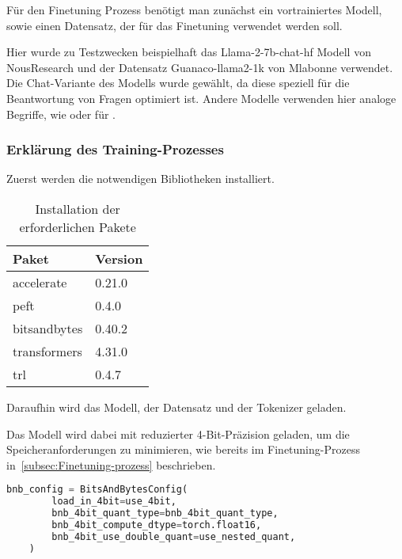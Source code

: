 \documentclass[german,report]{i1thesis}
\begin{document}
Für den Finetuning Prozess benötigt man zunächst ein vortrainiertes Modell, sowie einen Datensatz, der für das Finetuning verwendet werden soll.

Hier wurde zu Testzwecken beispielhaft das Llama-2-7b-chat-hf Modell von NousResearch \autocite{NousResearch2023-2} und der Datensatz Guanaco-llama2-1k von Mlabonne \autocite{mlabonne2023} verwendet.
Die Chat-Variante des Modells wurde gewählt, da diese speziell für die Beantwortung von Fragen optimiert ist.
Andere Modelle verwenden hier analoge Begriffe, wie  oder  für .


\subsubsection{Erklärung des Training-Prozesses}%
\label{subsec:training-prozess}

Zuerst werden die notwendigen Bibliotheken installiert.\\

\begin{table}[H]
    \centering
    \begin{tabular}{|l|l|}
        \toprule
        \textbf{Paket} & \textbf{Version} \\ \midrule
        accelerate     & 0.21.0           \\
        peft           & 0.4.0            \\
        bitsandbytes   & 0.40.2           \\
        transformers   & 4.31.0           \\
        trl            & 0.4.7            \\ \bottomrule
    \end{tabular}
    \caption{Installation der erforderlichen Pakete}
    \label{tab:installation}
\end{table}

Daraufhin wird das Modell, der Datensatz und der Tokenizer geladen.

Das Modell wird dabei mit reduzierter 4-Bit-Präzision geladen, um die Speicheranforderungen zu minimieren, wie bereits im Finetuning-Prozess in~\ref{subsec:Finetuning-prozess} beschrieben.\\

\begin{lstlisting}[language=Python]
    bnb_config = BitsAndBytesConfig(
        load_in_4bit=use_4bit,
        bnb_4bit_quant_type=bnb_4bit_quant_type,
        bnb_4bit_compute_dtype=torch.float16,
        bnb_4bit_use_double_quant=use_nested_quant,
    )
\end{lstlisting}
\end{document}
